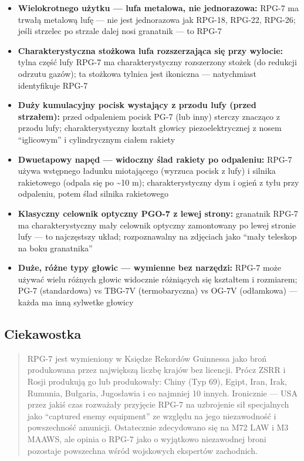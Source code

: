 \documentclass[12pt,oneside]{book}
\providecommand{\tightlist}{%
  \setlength{\itemsep}{0pt}\setlength{\parskip}{0pt}}
\begin{document}
\begin{itemize}
\tightlist
\item
  \textbf{Wielokrotnego użytku --- lufa metalowa, nie jednorazowa:}
  RPG-7 ma trwałą metalową lufę --- nie jest jednorazowa jak RPG-18,
  RPG-22, RPG-26; jeśli strzelec po strzale dalej nosi granatnik --- to
  RPG-7
\item
  \textbf{Charakterystyczna stożkowa lufa rozszerzająca się przy
  wylocie:} tylna część lufy RPG-7 ma charakterystyczny rozszerzony
  stożek (do redukcji odrzutu gazów); ta stożkowa tylnica jest ikoniczna
  --- natychmiast identyfikuje RPG-7
\item
  \textbf{Duży kumulacyjny pocisk wystający z przodu lufy (przed
  strzałem):} przed odpaleniem pocisk PG-7 (lub inny) sterczy znacząco z
  przodu lufy; charakterystyczny kształt głowicy piezoelektrycznej z
  nosem ``iglicowym'' i cylindrycznym ciałem rakiety
\item
  \textbf{Dwuetapowy napęd --- widoczny ślad rakiety po odpaleniu:}
  RPG-7 używa wstępnego ładunku miotającego (wyrzuca pocisk z lufy) i
  silnika rakietowego (odpala się po \textasciitilde10 m);
  charakterystyczny dym i ogień z tyłu przy odpaleniu, potem ślad
  silnika rakietowego
\item
  \textbf{Klasyczny celownik optyczny PGO-7 z lewej strony:} granatnik
  RPG-7 ma charakterystyczny mały celownik optyczny zamontowany po lewej
  stronie lufy --- to najczęstszy układ; rozpoznawalny na zdjęciach jako
  ``mały teleskop na boku granatnika''
\item
  \textbf{Duże, różne typy głowic --- wymienne bez narzędzi:} RPG-7 może
  używać wielu różnych głowic widocznie różniących się kształtem i
  rozmiarem; PG-7 (standardowa) vs TBG-7V (termobaryczna) vs OG-7V
  (odłamkowa) --- każda ma inną sylwetke głowicy
\end{itemize}

\subsection{Ciekawostka}\label{ciekawostka-83}

\begin{quote}
RPG-7 jest wymieniony w Księdze Rekordów Guinnessa jako broń produkowana
przez największą liczbę krajów bez licencji. Prócz ZSRR i Rosji
produkują go lub produkowały: Chiny (Typ 69), Egipt, Iran, Irak,
Rumunia, Bułgaria, Jugosławia i co najmniej 10 innych. Ironicznie ---
USA przez jakiś czas rozważały przyjęcie RPG-7 na uzbrojenie sił
specjalnych jako ``captured enemy equipment'' ze względu na jego
niezawodność i powszechność amunicji. Ostatecznie zdecydowano się na M72
LAW i M3 MAAWS, ale opinia o RPG-7 jako o wyjątkowo niezawodnej broni
pozostaje powszechna wśród wojskowych ekspertów zachodnich.
\end{quote}
\end{document}

